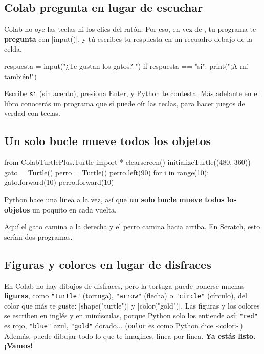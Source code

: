 \enlargethispage{3\baselineskip}

\subsection*{Colab pregunta en lugar de escuchar}

Colab no oye las teclas ni los clics del ratón. Por eso, en vez de , tu programa te \textbf{pregunta} con \py|input()|, y tú escribes tu respuesta en un recuadro debajo de la celda.

\begin{typethis}
respuesta = input("¿Te gustan los gatos? ")
if respuesta == "si":
    print("¡A mí también!")
\end{typethis}

Escribe \texttt{si} (sin acento), presiona Enter, y Python te contesta. Más adelante en el libro conocerás un programa que sí puede oír las teclas, para hacer juegos de verdad con teclas.

\subsection*{Un solo bucle mueve todos los objetos}

\noindent
\begin{minipage}[c]{0.64\linewidth}
\begin{typethis}
from ColabTurtlePlus.Turtle import *
clearscreen()
initializeTurtle((480, 360))
gato = Turtle()
perro = Turtle()
perro.left(90)
for i in range(10):
    gato.forward(10)
    perro.forward(10)
\end{typethis}
\end{minipage}\hfill
\begin{minipage}[c]{0.33\linewidth}\raggedright
Python hace una línea a la vez, así que \textbf{un solo bucle mueve todos los objetos} un poquito en cada vuelta.

Aquí el gato camina a la derecha y el perro camina hacia arriba. En Scratch, esto serían dos programas.
\end{minipage}

\subsection*{Figuras y colores en lugar de disfraces}

En Colab no hay dibujos de disfraces, pero la tortuga puede ponerse muchas \textbf{figuras}, como \texttt{"turtle"} (tortuga), \texttt{"arrow"} (flecha) o \texttt{"circle"} (círculo), del color que más te guste: \py|shape("turtle")| y \py|color("gold")|. Las figuras y los colores se escriben en inglés y en minúsculas, porque Python solo los entiende así: \texttt{"red"} es rojo, \texttt{"blue"} azul, \texttt{"gold"} dorado... (\texttt{color} es como Python dice «color».) Además, puede dibujar todo lo que te imagines, línea por línea. \textbf{Ya estás listo. ¡Vamos!}

